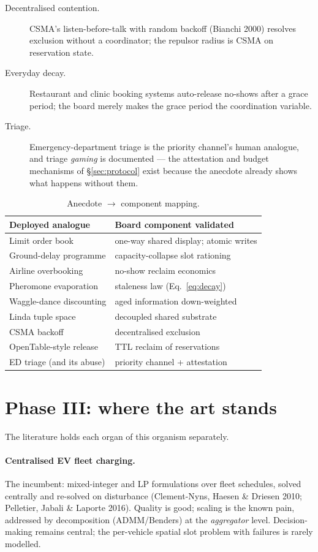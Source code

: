 \documentclass[twoside,twocolumn,usenatbib]{mnras}
\begin{document}
\begin{description}
\item[Decentralised contention.] CSMA's listen-before-talk with
random backoff (Bianchi 2000) resolves exclusion without a
coordinator; the repulsor radius is CSMA on reservation state.
\item[Everyday decay.] Restaurant and clinic booking systems
auto-release no-shows after a grace period; the board merely makes
the grace period the coordination variable.
\item[Triage.] Emergency-department triage is the priority channel's
human analogue, and triage \emph{gaming} is documented --- the
attestation and budget mechanisms of \S\ref{sec:protocol} exist
because the anecdote already shows what happens without them.
\end{description}

\begin{table}
\centering
\caption{Anecdote $\to$ component mapping.}
\label{tab:anec}
\begin{tabular}{@{}ll@{}}
\toprule
Deployed analogue & Board component validated \\
\midrule
Limit order book & one-way shared display; atomic writes \\
Ground-delay programme & capacity-collapse slot rationing \\
Airline overbooking & no-show reclaim economics \\
Pheromone evaporation & staleness law (Eq.~\ref{eq:decay}) \\
Waggle-dance discounting & aged information down-weighted \\
Linda tuple space & decoupled shared substrate \\
CSMA backoff & decentralised exclusion \\
OpenTable-style release & TTL reclaim of reservations \\
ED triage (and its abuse) & priority channel + attestation \\
\bottomrule
\end{tabular}
\end{table}

\section{Phase III: where the art stands}

\label{sec:phase3}

The literature holds each organ of this organism separately.

\paragraph{Centralised EV fleet charging.}  The incumbent: mixed-integer
and LP formulations over fleet schedules, solved centrally and
re-solved on disturbance (Clement-Nyns, Haesen \& Driesen 2010;
Pelletier, Jabali \& Laporte 2016).  Quality is good; scaling is the
known pain, addressed by decomposition (ADMM/Benders) at the
\emph{aggregator} level.  Decision-making remains central; the
per-vehicle spatial slot problem with failures is rarely modelled.
\end{document}
